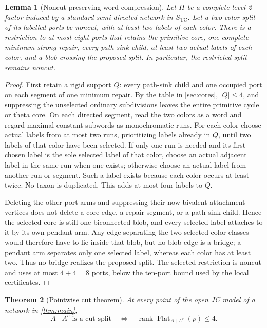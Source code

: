\documentclass[11pt]{article}
\newtheorem{theorem}{Theorem}[section]
\newtheorem{lemma}[theorem]{Lemma}
\theoremstyle{remark}
\newcommand{\TCs}{S_{\mathrm{TC}}}
\begin{document}
\begin{lemma}[Noncut-preserving word compression]\label{lem:noncut-compression}
Let $H$ be a complete level-2 factor induced by a standard semi-directed
network in $\TCs$.  Let a two-color split of its labelled ports be noncut,
with at least two labels of each color.  There is a restriction to at most
eight ports that retains the primitive core, one complete minimum strong
repair, every path-sink child, at least two actual labels of each color, and a
blob crossing the proposed split.  In particular, the restricted split
remains noncut.
\end{lemma}

\begin{proof}
First retain a rigid support $Q$: every path-sink child and one occupied port
on each segment of one minimum repair.  By the table in \cref{sec:cores},
$|Q|\le4$, and suppressing the unselected ordinary subdivisions leaves the
entire primitive cycle or theta core.  On each directed segment, read the two
colors as a word and regard maximal constant subwords as monochromatic runs.
For each color choose actual labels from at most two runs, prioritizing labels
already in $Q$, until two labels of that color have been selected.  If only
one run is needed and its first chosen label is the sole selected label of
that color, choose an actual adjacent label in the same run when one exists;
otherwise choose an actual label from another run or segment.  Such a label
exists because each color occurs at least twice.  No taxon is duplicated.
This adds at most four labels to $Q$.

Deleting the other port arms and suppressing their now-bivalent attachment
vertices does not delete a core edge, a repair segment, or a path-sink child.
Hence the selected core is still one biconnected blob, and every selected
label attaches to it by its own pendant arm.  Any edge separating the two
selected color classes would therefore have to lie inside that blob, but no
blob edge is a bridge; a pendant arm separates only one selected label,
whereas each color has at least two.  Thus no bridge realizes the proposed
split.  The selected restriction is noncut and uses at most $4+4=8$ ports,
below the ten-port bound used by the local certificates.
\end{proof}

\begin{theorem}[Pointwise cut theorem]\label{thm:cuts}
At every point of the open JC model of a network in \cref{thm:main},
\[
A\mid A^c\text{ is a cut split}
\quad\Longleftrightarrow\quad
\operatorname{rank}\operatorname{Flat}_{A\mid A^c}(p)\le4.
\]
\end{theorem}
\end{document}
